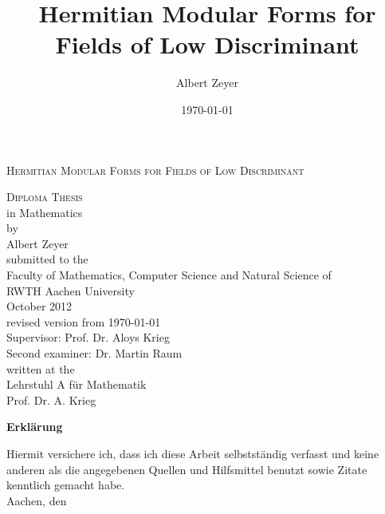 \documentclass[twoside,openright]{article}
\begin{document}
\title{Hermitian Modular Forms for Fields of Low Discriminant}
\author{Albert Zeyer}
\date{\today}

\begin{titlepage}
\begin{center}
\setlength{\parskip}{2ex plus0.5ex minus0.2ex}
\setlength{\baselineskip}{5ex}
\textsc{\LARGE Hermitian Modular Forms for Fields of Low Discriminant}\\[2cm]

\setlength{\baselineskip}{3ex}

\textsc{Diploma Thesis} \\
in Mathematics \\[0.7cm]

by \\
Albert Zeyer \\[3cm]

submitted to the \\
Faculty of Mathematics, Computer Science and Natural Science of \\
RWTH Aachen University \\[1.5cm]

October 2012 \\
revised version from \today \\[1.5cm]

Supervisor: Prof. Dr. Aloys Krieg \\
Second examiner: Dr. Martin Raum \\[1.5cm]

written at the \\
Lehrstuhl A für Mathematik \\
Prof. Dr. A. Krieg

\end{center}
\end{titlepage}


\newpage
\thispagestyle{empty}
\mbox{}

\begin{titlepage}
\thispagestyle{empty}
\setlength{\parindent}{0pt}
\setlength{\parskip}{3ex}
\textbf{\large Erklärung}

Hiermit versichere ich, dass ich diese Arbeit selbstständig verfasst und keine anderen als die angegebenen Quellen und Hilfsmittel benutzt sowie Zitate kenntlich gemacht habe.\\

Aachen, den \todaygerman
\end{titlepage}
\end{document}
